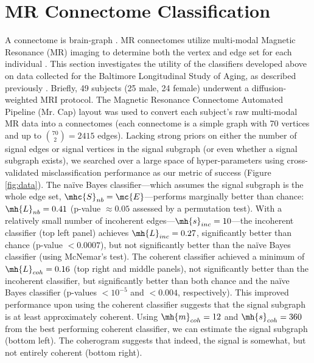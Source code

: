 \documentclass[10pt,journal,cspaper,compsoc]{IEEEtran}
\begin{document}

\section{MR Connectome Classification} %
\label{sub:mr_connectome_classification}

A connectome is brain-graph \cite{Sporns2010}.  MR connectomes utilize multi-modal Magnetic Resonance (MR) imaging to determine both the vertex and edge set for each individual \cite{Hagmann2010}.  This section investigates the utility of the classifiers developed above on data collected for the Baltimore Longitudinal Study of Aging, as described previously \cite{OHBM10}.  Briefly, 49 subjects (25 male, 24 female) underwent a diffusion-weighted MRI protocol. The Magnetic Resonance Connectome Automated Pipeline (Mr. Cap) layout was used to convert each subject's raw multi-modal MR data into a connectomes \cite{BMES10} (each connectome is a simple graph with 70 vertices and up to $\binom{70}{2}=2415$ edges). Lacking strong priors on either the number of signal edges or signal vertices in the signal subgraph (or even whether a signal subgraph exists), we searched over a large space of hyper-parameters using cross-validated misclassification performance as our metric of success (Figure \ref{fig:data}).  The na\"ive Bayes classifier---which assumes the signal subgraph is the whole edge set, $\mhc{S}_{nb}=\mc{E}$---performs marginally better than chance: $\mh{L}_{nb}=0.41$ (p-value $\approx 0.05$ assessed by a permutation test).  With a relatively small number of incoherent edges---$\mh{s}_{inc}=10$---the incoherent classifier (top left panel) achieves $\mh{L}_{inc}=0.27$, significantly better than chance (p-value $<0.0007$), but not significantly better than the na\"ive Bayes classifier (using McNemar's test).  The coherent classifier achieved a minimum of $\mh{L}_{coh}=0.16$ (top right and middle panels), not significantly better than the incoherent classifier, but significantly better than both chance and the na\"ive Bayes classifier (p-values $<10^{-5}$ and $<0.004$, respectively).  This improved performance upon using the coherent classifier suggests that the signal subgraph is at least approximately coherent. Using $\mh{m}_{coh}=12$ and $\mh{s}_{coh}=360$ from the best performing coherent classifier, we can estimate the signal subgraph (bottom left).  The coherogram suggests that indeed, the signal is somewhat, but not entirely coherent (bottom right).
\end{document}
